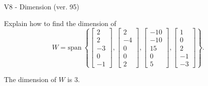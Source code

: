 \begin{exercise}
  \begin{exerciseTitle}V8 - Dimension (ver. 95)\end{exerciseTitle}
  \begin{exerciseStatement}
    Explain how to find the dimension of 
\[W=\mathrm{span}\ \left\{\left[\begin{array}{r}
2 \\
2 \\
-3 \\
0 \\
-1
\end{array}\right] , \left[\begin{array}{r}
2 \\
-4 \\
0 \\
0 \\
2
\end{array}\right] , \left[\begin{array}{r}
-10 \\
-10 \\
15 \\
0 \\
5
\end{array}\right] , \left[\begin{array}{r}
1 \\
0 \\
2 \\
-1 \\
-3
\end{array}\right]\right\}.\]



  \end{exerciseStatement}
  \begin{exerciseAnswer}
   The dimension of \(W\) is  \(3\).
  


  \end{exerciseAnswer}
\end{exercise}